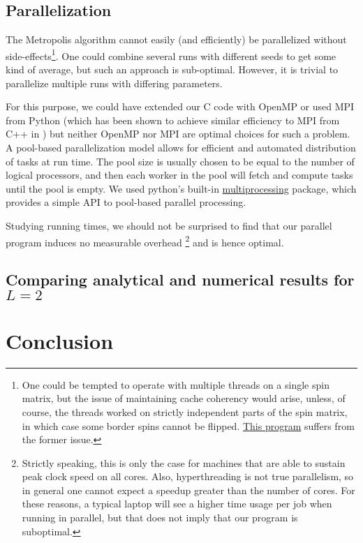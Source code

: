 \documentclass[a4paper]{article}
\begin{document}
\subsection{Parallelization}
The Metropolis algorithm cannot easily (and efficiently) be parallelized without side-effects\footnote{One could be tempted to operate with multiple threads on a single spin matrix, but the issue of maintaining cache coherency would arise, unless, of course, the threads worked on strictly independent parts of the spin matrix, in which case some border spins cannot be flipped.  \href{https://github.com/CompPhysics/ComputationalPhysics/blob/082ee7e/doc/Programs/ParallelizationOpenMP/OpenMPising.cpp}{This program} suffers from the former issue.}. One could combine several runs with different seeds to get some kind of average, but such an approach is sub-optimal. However, it is trivial to parallelize multiple runs with differing parameters.

For this purpose, we could have extended our C code with OpenMP or used MPI from Python (which has been shown to achieve similar efficiency to MPI from C++ in \cite{mortensen_langtangen_hpc_python}) but neither OpenMP nor MPI are optimal choices for such a problem. A pool-based parallelization model allows for efficient and automated distribution of tasks at run time. The pool size is usually chosen to be equal to the number of logical processors, and then each worker in the pool will fetch and compute tasks until the pool is empty. We used python's built-in \href{https://docs.python.org/2/library/multiprocessing.html}{multiprocessing} package, which provides a simple API to pool-based parallel processing.

Studying running times, we should not be surprised to find that our parallel program induces no measurable overhead \footnote{Strictly speaking, this is only the case for machines that are able to sustain peak clock speed on all cores. Also, hyperthreading is not true parallelism, so in general one cannot expect a speedup greater than the number of cores. For these reasons, a typical laptop will see a higher time usage per job when running in parallel, but that does not imply that our program is suboptimal.} and is hence optimal.

\subsection{Comparing analytical and numerical results for $L=2$}


\section{Conclusion}\label{sec:conclusion}

%
%

{}
\end{document}
